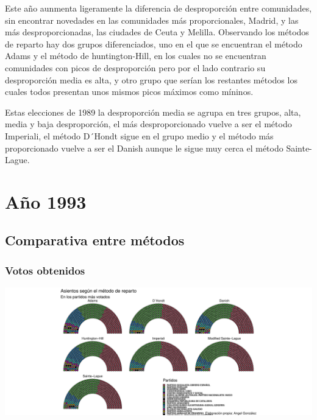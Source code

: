 \documentclass[12pt,a4paper,]{book}
\numberwithin{dummy}{section}
\theoremstyle{ocrenumbox}
\theoremstyle{blacknumex}
\theoremstyle{blacknumbox}
\theoremstyle{ocrenum}
\theoremstyle{ocrenum}
\begin{document}
Este año aunmenta ligeramente la diferencia de desproporción entre
comunidades, sin encontrar novedades en las comunidades más
proporcionales, Madrid, y las más desproporcionadas, las ciudades de
Ceuta y Melilla. Observando los métodos de reparto hay dos grupos
diferenciados, uno en el que se encuentran el método Adams y el método
de huntington-Hill, en los cuales no se encuentran comunidades con picos
de desproporción pero por el lado contrario su desproporción media es
alta, y otro grupo que serían los restantes métodos los cuales todos
presentan unos mismos picos máximos como míninos.

Estas elecciones de 1989 la desproporción media se agrupa en tres
grupos, alta, media y baja desproporción, el más desproporcionado vuelve
a ser el método Imperiali, el método D´Hondt sigue en el grupo medio y
el método más proporcionado vuelve a ser el Danish aunque le sigue muy
cerca el método Sainte-Lague.

\hypertarget{auxf1o-1993}{%
\section{Año 1993}\label{auxf1o-1993}}

\hypertarget{comparativa-entre-muxe9todos-5}{%
\subsection{Comparativa entre
métodos}\label{comparativa-entre-muxe9todos-5}}

\hypertarget{votos-obtenidos-5}{%
\subsubsection{Votos obtenidos}\label{votos-obtenidos-5}}

\begin{center}\includegraphics[width=0.95\linewidth]{figurasR/unnamed-chunk-107-1} \end{center}
\end{document}
